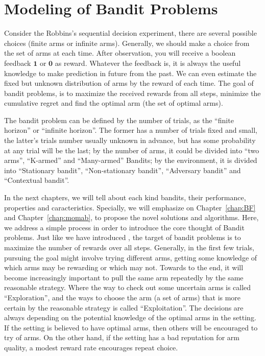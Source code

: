 \section{Modeling of Bandit Problems}
\label{sec:modeling}

Consider the Robbins's sequential decision experiment\cite{robbins1952bandit}, there are several possible choices (finite arms or infinite arms). Generally, we should make a choice from the set of arms at each time. After observation, you will receive a boolean feedback $\mathbf{1}$ or $\mathbf{0}$  as reward. 
Whatever the feedback is, it is always the useful knowledge to make prediction in future from the past. We can even estimate the fixed but unknown distribution of arms by the reward of each time. The goal of bandit problems, is to maximize the received rewards from all steps, minimize the cumulative regret and find the optimal arm (the set of optimal arms). 

The bandit problem can be defined by the number of trials, as the ``finite horizon'' or ``infinite horizon''. The former has a number of trials fixed and small, the latter's trials number usually unknown in advance, but has some probability at any trial will be the last; by the number of arms, it could be divided into ``two arms'', ``K-armed'' and ``Many-armed'' Bandits; by the environment, it is divided into ``Stationary bandit'', ``Non-stationary bandit'', ``Adversary bandit'' and ``Contextual bandit''.

In the next chapters, we will tell about each kind bandits, their performance, properties and caracteristics. Specially, we will emphasize on Chapter~\ref{chap:BF} and Chapter~\ref{chap:momab}, to propose the novel solutions and algorithms. Here, we address a simple process in order to introduce the core thought of Bandit problems. Just like we have introduced , the target of bandit problems is to maximize the number of rewards over all steps. Generally, in the first few trials, pursuing the goal might involve trying different arms, getting some knowledge of which arms may be rewarding or which may not. Towards to the end, it will become increasingly important to pull the same  arm repeatedly by the same reasonable strategy. Where the way to check out some uncertain arms is called ``Exploration'', and the ways to choose the arm (a set of arms) that is more certain by the reasonable strategy is called ``Exploitation''. 
The decisions are always depending on the potential knowledge of the optimal arms in the setting. If the setting is believed to have optimal arms, then others will be encouraged to try of arms. On the other hand, if the setting has a bad reputation for arm quality, a modest reward rate encourages repeat choice.

